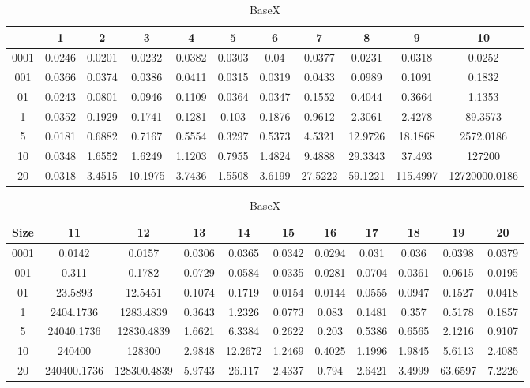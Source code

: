\newpage
\begin{center}
\begin{table}[ht]
\tiny
\label{basex-query-result-table}
\caption{BaseX}
\begin{tabular}{|c|c|c|c|c|c|c|c|c|c|c| } 
    &  1 & 2 & 3 & 4 & 5 & 6 & 7 & 8 & 9 & 10 \\
 \hline
0001 & 0.0246 & 0.0201 & 0.0232 & 0.0382 & 0.0303 & 0.04 & 0.0377 & 0.0231 & 0.0318 & 0.0252	\\
001 & 0.0366 & 0.0374 & 0.0386 & 0.0411 & 0.0315 & 0.0319 & 0.0433 & 0.0989 & 0.1091 & 0.1832	\\
01 & 0.0243 & 0.0801 & 0.0946 & 0.1109 & 0.0364 & 0.0347 & 0.1552 & 0.4044 & 0.3664 & 1.1353	\\
1 & 0.0352 & 0.1929 & 0.1741 & 0.1281 & 0.103 & 0.1876 & 0.9612 & 2.3061 & 2.4278 & 89.3573	\\
5 & 0.0181 & 0.6882 & 0.7167 & 0.5554 & 0.3297 & 0.5373 & 4.5321 & 12.9726 & 18.1868 & 2572.0186	\\
10 & 0.0348 & 1.6552 & 1.6249 & 1.1203 & 0.7955 & 1.4824 & 9.4888 & 29.3343 & 37.493 & 127200	\\
20 & 0.0318 & 3.4515 & 10.1975 & 3.7436 & 1.5508 & 3.6199 & 27.5222 & 59.1221 & 115.4997 & 12720000.0186	\\
\end{tabular}
\begin{tabular}{|c|c|c|c|c|c|c|c|c|c|c| } 
Size & 11 & 12 & 13 & 14 & 15 & 16 & 17 & 18 & 19 & 20	\\
\hline
0001 & 0.0142 & 0.0157 & 0.0306 & 0.0365 & 0.0342 & 0.0294 & 0.031 & 0.036 & 0.0398 & 0.0379	\\
001 & 0.311 & 0.1782 & 0.0729 & 0.0584 & 0.0335 & 0.0281 & 0.0704 & 0.0361 & 0.0615 & 0.0195	\\
01 & 23.5893 & 12.5451 & 0.1074 & 0.1719 & 0.0154 & 0.0144 & 0.0555 & 0.0947 & 0.1527 & 0.0418	\\
1 & 2404.1736 & 1283.4839 & 0.3643 & 1.2326 & 0.0773 & 0.083 & 0.1481 & 0.357 & 0.5178 & 0.1857	\\
5 & 24040.1736 & 12830.4839 & 1.6621 & 6.3384 & 0.2622 & 0.203 & 0.5386 & 0.6565 & 2.1216 & 0.9107	\\
10 & 240400 & 128300 & 2.9848 & 12.2672 & 1.2469 & 0.4025 & 1.1996 & 1.9845 & 5.6113 & 2.4085	\\
20 & 240400.1736 & 128300.4839 & 5.9743 & 26.117 & 2.4337 & 0.794 & 2.6421 & 3.4999 & 63.6597 & 7.2226	\\
\end{tabular}
\end{table}


\end{center}
